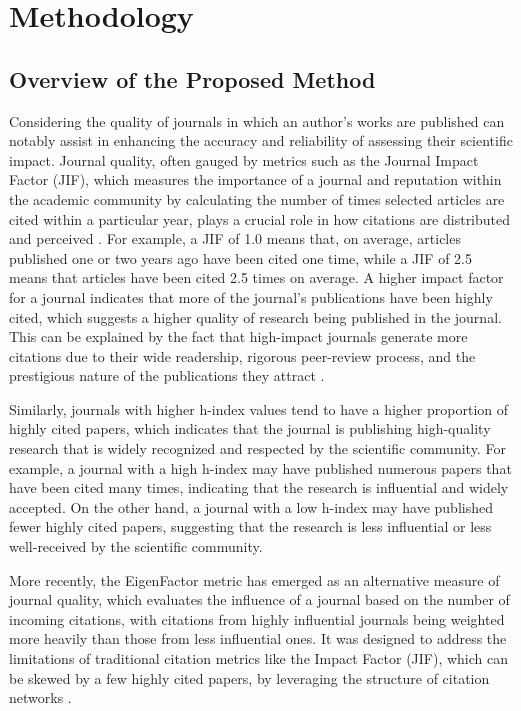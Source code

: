 \chapter{Methodology}
\label{ch:methods}

\section{Overview of the Proposed Method}

Considering the quality of journals in which an author's works are published
can notably assist in enhancing the accuracy and reliability of assessing their
scientific impact. Journal quality, often gauged by metrics such as the Journal
Impact Factor (JIF), which measures the importance of a journal and reputation
within the academic community by calculating the number of times selected
articles are cited within a particular year, plays a crucial role in how
citations are distributed and perceived \cite{garfield1999journal,
      garfield2006history}. For example, a JIF of 1.0 means that, on average,
articles published one or two years ago have been cited one time, while a JIF
of 2.5 means that articles have been cited 2.5 times on average. A higher
impact factor for a journal indicates that more of the journal's publications
have been highly cited, which suggests a higher quality of research being
published in the journal. This can be explained by the fact that high-impact
journals generate more citations due to their wide readership, rigorous
peer-review process, and the prestigious nature of the publications they
attract \cite{garfield2006history}.

Similarly, journals with higher h-index values tend to have a higher proportion
of highly cited papers, which indicates that the journal is publishing
high-quality research that is widely recognized and respected by the scientific
community. For example, a journal with a high h-index may have published
numerous papers that have been cited many times, indicating that the research
is influential and widely accepted. On the other hand, a journal with a
low h-index may have published fewer highly cited papers, suggesting that the
research is less influential or less well-received by the scientific community.

More recently, the EigenFactor metric has emerged as an alternative measure of
journal quality, which evaluates the influence of a journal based on the number
of incoming citations, with citations from highly influential journals being
weighted more heavily than those from less influential ones. It was designed to
address the limitations of traditional citation metrics like the Impact Factor
(JIF), which can be skewed by a few highly cited papers, by leveraging the
structure of citation networks \cite{bergstrom2007eigenfactor}.

